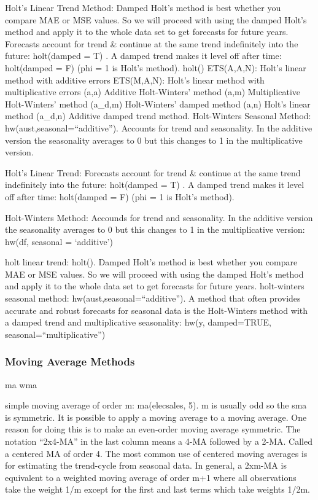 \documentclass[]{book}
\begin{document}
Holt's Linear Trend Method: Damped Holt's method is best whether you
compare MAE or MSE values. So we will proceed with using the damped
Holt's method and apply it to the whole data set to get forecasts for
future years. Forecasts account for trend \& continue at the same trend
indefinitely into the future: holt(damped = T) . A damped trend makes it
level off after time: holt(damped = F) (phi = 1 is Holt's method).
holt() \textbar{} ETS(A,A,N): Holt's linear method with additive errors
\textbar{} ETS(M,A,N): Holt's linear method with multiplicative errors
\textbar{} (a,a) Additive Holt-Winters' method \textbar{} (a,m)
Multiplicative Holt-Winters' method \textbar{} (a\_d,m) Holt-Winters'
damped method \textbar{} (a,n) Holt's linear method \textbar{} (a\_d,n)
Additive damped trend method. Holt-Winters Seasonal Method:
hw(aust,seasonal=``additive''). Accounts for trend and seasonality. In
the additive version the seasonality averages to 0 but this changes to 1
in the multiplicative version.

Holt's Linear Trend: Forecasts account for trend \& continue at the same
trend indefinitely into the future: holt(damped = T) . A damped trend
makes it level off after time: holt(damped = F) (phi = 1 is Holt's
method).

Holt-Winters Method: Accounds for trend and seasonality. In the additive
version the seasonality averages to 0 but this changes to 1 in the
multiplicative version: hw(df, seasonal = `additive')

holt linear trend: holt(). Damped Holt's method is best whether you
compare MAE or MSE values. So we will proceed with using the damped
Holt's method and apply it to the whole data set to get forecasts for
future years. holt-winters seasonal method:
hw(aust,seasonal=``additive''). A method that often provides accurate
and robust forecasts for seasonal data is the Holt-Winters method with a
damped trend and multiplicative seasonality: hw(y, damped=TRUE,
seasonal=``multiplicative'')

\subsubsection{Moving Average Methods}\label{moving-average-methods}

ma wma

simple moving average of order m: ma(elecsales, 5). m is usually odd so
the sma is symmetric. It is possible to apply a moving average to a
moving average. One reason for doing this is to make an even-order
moving average symmetric. The notation ``2x4-MA'' in the last column
means a 4-MA followed by a 2-MA. Called a centered MA of order 4. The
most common use of centered moving averages is for estimating the
trend-cycle from seasonal data. In general, a 2xm-MA is equivalent to a
weighted moving average of order m+1 where all observations take the
weight 1/m except for the first and last terms which take weights 1/2m.
\end{document}
